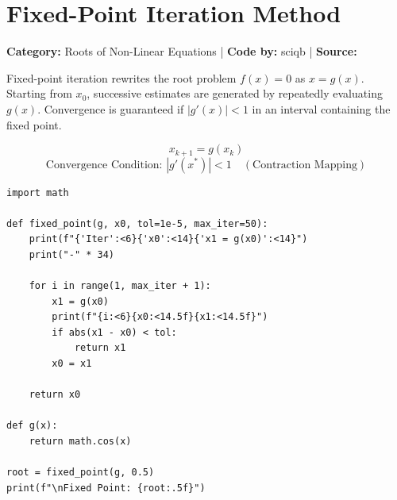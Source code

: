 \documentclass[10pt,a4paper]{report}
\begin{document}
\newpage


\section{Fixed-Point Iteration Method}
\textbf{Category:} \textcolor{secondary}{Roots of Non-Linear Equations} \quad | \quad \textbf{Code by:} \textcolor{secondary}{sciqb} \quad | \quad \textbf{Source:} \texttt{}

Fixed-point iteration rewrites the root problem $f(x) = 0$ as $x = g(x)$. Starting from $x_0$, successive estimates are generated by repeatedly evaluating $g(x)$. Convergence is guaranteed if $|g'(x)| < 1$ in an interval containing the fixed point.

\begin{tcolorbox}[colback=theorybg,colframe=theoryframe,title=\textbf{Mathematical Theory \& Formulation},boxrule=1pt,arc=2mm]
\[
x_{k+1} = g(x_k)
\]
\[
\text{Convergence Condition: } |g'(x^*)| < 1 \quad (\text{Contraction Mapping})
\]
\end{tcolorbox}

\begin{tcolorbox}[colback=codebg,colframe=secondary,title=\textbf{Python Implementation (Step-by-Step Functions)},boxrule=1pt,arc=2mm]
\begin{lstlisting}[style=python_detailed]
import math

def fixed_point(g, x0, tol=1e-5, max_iter=50):
    print(f"{'Iter':<6}{'x0':<14}{'x1 = g(x0)':<14}")
    print("-" * 34)

    for i in range(1, max_iter + 1):
        x1 = g(x0)
        print(f"{i:<6}{x0:<14.5f}{x1:<14.5f}")
        if abs(x1 - x0) < tol:
            return x1
        x0 = x1

    return x0

def g(x):
    return math.cos(x)

root = fixed_point(g, 0.5)
print(f"\nFixed Point: {root:.5f}")


\end{lstlisting}
\end{tcolorbox}
\end{document}
